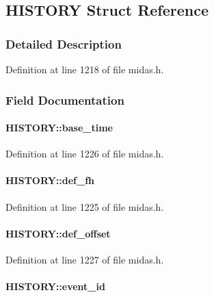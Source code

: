 \subsection{HISTORY Struct Reference}
\label{structHISTORY}


\subsubsection{Detailed Description}


Definition at line 1218 of file midas.h.

\subsubsection{Field Documentation}
\paragraph[{base\_\-time}]{ {\bf HISTORY::base\_\-time}}\hfill\label{structHISTORY_a7bc815860465a4962450eb181ab6a6e3}


Definition at line 1226 of file midas.h.
\paragraph[{def\_\-fh}]{ {\bf HISTORY::def\_\-fh}}\hfill\label{structHISTORY_acbcd08fbd4a1a660d097850b410d80ac}


Definition at line 1225 of file midas.h.
\paragraph[{def\_\-offset}]{ {\bf HISTORY::def\_\-offset}}\hfill\label{structHISTORY_a321719dd05a884e2bca6cba8ca5b47ea}


Definition at line 1227 of file midas.h.
\paragraph[{event\_\-id}]{ {\bf HISTORY::event\_\-id}}\hfill\label{structHISTORY_a322ce5ffb593fad70e8c2057d3835b5a}


